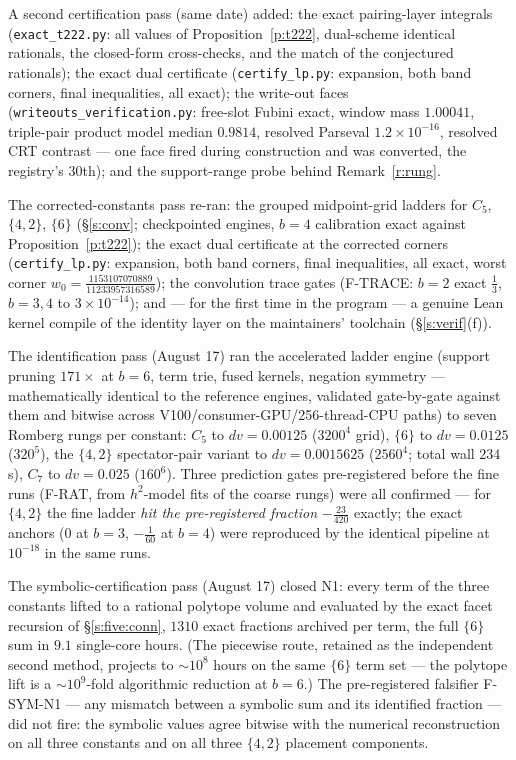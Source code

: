 \documentclass[11pt]{article}
\numberwithin{equation}{section}
\theoremstyle{definition}
\theoremstyle{remark}
\begin{document}
A second certification pass (same date) added: the exact
pairing-layer integrals (\texttt{exact\_t222.py}: all values of
Proposition~\ref{p:t222}, dual-scheme identical rationals, the
closed-form cross-checks, and the match of the conjectured
rationals); the exact dual certificate
(\texttt{certify\_lp.py}: expansion, both band corners, final
inequalities, all exact); the write-out faces
(\texttt{writeouts\_verification.py}: free-slot Fubini exact,
window mass $1.00041$, triple-pair product model median $0.9814$,
resolved Parseval $1.2\times10^{-16}$, resolved CRT contrast ---
one face fired during construction and was converted, the
registry's $30$th); and the support-range probe behind
Remark~\ref{r:rung}.

The corrected-constants pass re-ran: the grouped
midpoint-grid ladders for $C_5$, $\{4,2\}$, $\{6\}$
(\S\ref{s:conv}; checkpointed engines, $b=4$ calibration exact
against Proposition~\ref{p:t222}); the exact dual certificate at
the corrected corners (\texttt{certify\_lp.py}: expansion,
both band corners, final inequalities, all exact, worst corner
$w_0=\tfrac{1153107070889}{11233957316589}$); the convolution
trace gates (F-TRACE: $b=2$ exact $\tfrac13$, $b=3,4$ to
$3\times10^{-14}$); and --- for the first time in the program
--- a genuine Lean kernel compile of the identity layer on the
maintainers' toolchain (\S\ref{s:verif}(f)).

The identification pass (August 17) ran the accelerated ladder
engine (support pruning $171\times$ at $b=6$, term trie, fused
kernels, negation symmetry --- mathematically identical to the
reference engines, validated gate-by-gate against them and
bitwise across V100/consumer-GPU/256-thread-CPU paths) to seven
Romberg rungs per constant: $C_5$ to $dv=0.00125$ ($3200^4$
grid), $\{6\}$ to $dv=0.0125$ ($320^5$), the $\{4,2\}$
spectator-pair variant to $dv=0.0015625$ ($2560^4$; total wall
$234$\,s), $C_7$ to $dv=0.025$ ($160^6$). Three prediction
gates pre-registered before the fine runs (F-RAT, from
$h^{2}$-model fits of the coarse rungs) were all confirmed ---
for $\{4,2\}$ the fine ladder \emph{hit the pre-registered
fraction} $-\tfrac{23}{420}$ exactly; the exact anchors ($0$
at $b=3$, $-\tfrac1{60}$ at $b=4$) were reproduced by the
identical pipeline at $10^{-18}$ in the same runs.

The symbolic-certification pass (August 17) closed N1: every term of
the three constants lifted to a rational polytope volume and
evaluated by the exact facet recursion of
\S\ref{s:five:conn}, $1310$ exact fractions archived per
term, the full $\{6\}$ sum in $9.1$ single-core hours. (The
piecewise route, retained as the independent second method,
projects to $\sim10^{8}$ hours on the same $\{6\}$ term set
--- the polytope lift is a $\sim10^{9}$-fold algorithmic
reduction at $b=6$.) The pre-registered falsifier F-SYM-N1
--- any mismatch between a symbolic sum and its identified
fraction --- did not fire: the symbolic values agree bitwise
with the numerical reconstruction on all three constants and
on all three $\{4,2\}$ placement components.
\end{document}
